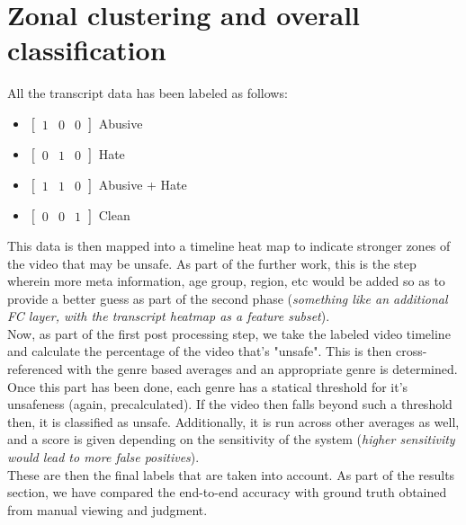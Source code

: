 \documentclass{article}[A4]
\begin{document}
\section{Zonal clustering and overall classification}

All the transcript data has been labeled as follows:
\begin{itemize}
\item {$\begin{bmatrix}1 & 0 & 0\end{bmatrix}$ Abusive}
\item {$\begin{bmatrix}0 & 1 & 0\end{bmatrix}$ Hate}
\item {$\begin{bmatrix}1 & 1 & 0\end{bmatrix}$ Abusive + Hate}
\item {$\begin{bmatrix}0 & 0 & 1\end{bmatrix}$ Clean}
\end{itemize}

This data is then mapped into a timeline heat map to indicate stronger zones of the video that may be unsafe. As part of the further work, this is the step wherein more meta information, age group, region, etc would be added so as to provide a better guess as part of the second phase (\textit{something like an additional FC layer, with the transcript heatmap as a feature subset}). \\

Now, as part of the first post processing step, we take the labeled video timeline and calculate the percentage of the video that's "unsafe". This is then cross-referenced with the genre based averages and an appropriate genre is determined. Once this part has been done, each genre has a statical threshold for it's unsafeness (again, precalculated). If the video then falls beyond such a threshold then, it is classified as unsafe. Additionally, it is run across other averages as well, and a score is given depending on the sensitivity of the system (\textit{higher sensitivity would lead to more false positives}). \\

These are then the final labels that are taken into account. As part of the results section, we have compared the end-to-end accuracy with ground truth obtained from manual viewing and judgment.
\end{document}
